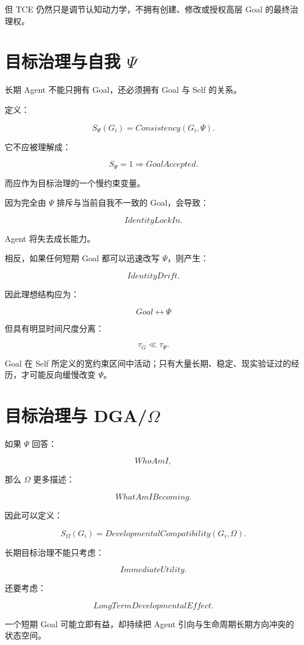 但 TCE 仍然只是调节认知动力学，不拥有创建、修改或授权高层 Goal 的最终治理权。


\section{目标治理与自我 $\Psi$}

长期 Agent 不能只拥有 Goal，还必须拥有 Goal 与 Self 的关系。

定义：

\[
S_\Psi(G_i)
=
Consistency(G_i,\Psi).
\]

它不应被理解成：

\[
S_\Psi=1
\Rightarrow
GoalAccepted.
\]

而应作为目标治理的一个慢约束变量。

因为完全由 $\Psi$ 排斥与当前自我不一致的 Goal，会导致：

\[
\boxed{
IdentityLockIn.
}
\]

Agent 将失去成长能力。

相反，如果任何短期 Goal 都可以迅速改写 $\Psi$，则产生：

\[
\boxed{
IdentityDrift.
}
\]

因此理想结构应为：

\[
\boxed{
Goal
\leftrightarrow
\Psi
}
\]

但具有明显时间尺度分离：

\[
\tau_G
\ll
\tau_\Psi.
\]

Goal 在 Self 所定义的宽约束区间中活动；只有大量长期、稳定、现实验证过的经历，才可能反向缓慢改变 $\Psi$。


\section{目标治理与 DGA/$\Omega$}

如果 $\Psi$ 回答：

\[
WhoAmI,
\]

那么 $\Omega$ 更多描述：

\[
WhatAmIBecoming.
\]

因此可以定义：

\[
S_\Omega(G_i)
=
DevelopmentalCompatibility(G_i,\Omega).
\]

长期目标治理不能只考虑：

\[
ImmediateUtility.
\]

还要考虑：

\[
\boxed{
LongTermDevelopmentalEffect.
}
\]

一个短期 Goal 可能立即有益，却持续把 Agent 引向与生命周期长期方向冲突的状态空间。

